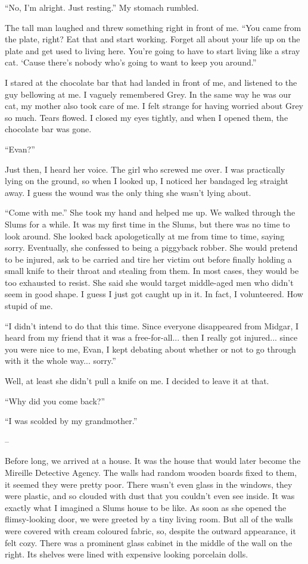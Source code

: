 \documentclass[oneside]{book}
\begin{document}
“No, I’m alright. Just resting.” My stomach rumbled.

The tall man laughed and threw something right in front of me. “You came from the plate, right? Eat that and start working. Forget all about your life up on the plate and get used to living here. You’re going to have to start living like a stray cat. ‘Cause there’s nobody who’s going to want to keep you around.”

I stared at the chocolate bar that had landed in front of me, and listened to the guy bellowing at me. I vaguely remembered Grey. In the same way he was our cat, my mother also took care of me. I felt strange for having worried about Grey so much. Tears flowed. I closed my eyes tightly, and when I opened them, the chocolate bar was gone.

“Evan?”

Just then, I heard her voice. The girl who screwed me over. I was practically lying on the ground, so when I looked up, I noticed her bandaged leg straight away. I guess the wound was the only thing she wasn’t lying about.

“Come with me.” She took my hand and helped me up. We walked through the Slums for a while. It was my first time in the Slums, but there was no time to look around. She looked back apologetically at me from time to time, saying sorry. Eventually, she confessed to being a piggyback robber. She would pretend to be injured, ask to be carried and tire her victim out before finally holding a small knife to their throat and stealing from them. In most cases, they would be too exhausted to resist. She said she would target middle-aged men who didn’t seem in good shape. I guess I just got caught up in it. In fact, I volunteered. How stupid of me.

“I didn’t intend to do that this time. Since everyone disappeared from Midgar, I heard from my friend that it was a free-for-all... then I really got injured... since you were nice to me, Evan, I kept debating about whether or not to go through with it the whole way... sorry.”

Well, at least she didn’t pull a knife on me. I decided to leave it at that.

“Why did you come back?”

“I was scolded by my grandmother.”

–

Before long, we arrived at a house. It was the house that would later become the Mireille Detective Agency. The walls had random wooden boards fixed to them, it seemed they were pretty poor. There wasn’t even glass in the windows, they were plastic, and so clouded with dust that you couldn’t even see inside. It was exactly what I imagined a Slums house to be like. As soon as she opened the flimsy-looking door, we were greeted by a tiny living room. But all of the walls were covered with cream coloured fabric, so, despite the outward appearance, it felt cozy. There was a prominent glass cabinet in the middle of the wall on the right. Its shelves were lined with expensive looking porcelain dolls.
\end{document}
